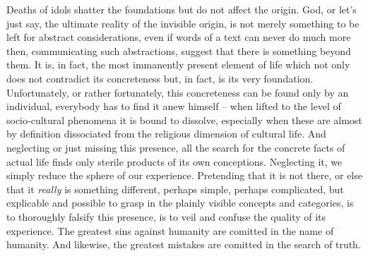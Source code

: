\pa Deaths of idols shatter the foundations but do not affect the
origin. God, or let's just say, the ultimate
reality of the invisible origin, is not merely something to be left
for abstract considerations, even if words of a text
can never do much more then, communicating such abstractions, suggest 
that there is something beyond them.  It is, in
fact, the most immanently present element of life which not only does
not contradict its concreteness but, in fact, is its very
foundation. Unfortunately, or rather fortunately, this concreteness can be found
only by an individual, everybody has to find it anew himself -- when lifted to
the level of socio-cultural phenomena it is bound to dissolve, especially when
these are almost by definition dissociated from the religious dimension of
cultural life. And neglecting or just missing this presence, all the
search for the concrete facts of actual life finds only sterile
products of its own conceptions. 
Neglecting it, we simply reduce the sphere of our experience. Pretending that it
is not there, or else that it {\em really} is something different, perhaps
simple, perhaps complicated, but explicable and possible to grasp in the
plainly visible concepts and categories, is to thoroughly falsify this presence, is to
veil and confuse the quality of its experience. The greatest sins against
humanity are comitted in the name of humanity. And likewise, the greatest
mistakes are comitted in the search of truth.
%

